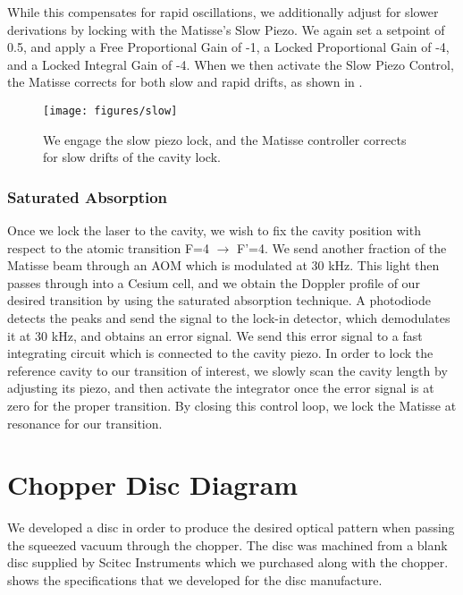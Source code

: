 While this compensates for rapid oscillations, we additionally adjust for slower derivations by locking with the Matisse's Slow Piezo.  We again set a setpoint of 0.5, and apply a Free Proportional Gain of -1, a Locked Proportional Gain of -4, and a Locked Integral Gain of -4.  When we then activate the Slow Piezo Control, the Matisse corrects for both slow and rapid drifts, as shown in .

\begin{figure}[!ht] 
 \centering 
 \texttt{[image: figures/slow]} 
 \caption[Matisse slow piezo lock]{We engage the slow piezo lock, and the Matisse controller corrects for slow drifts of the cavity lock.} 
 \label{fig:slow} 
\end{figure}

\subsubsection{Saturated Absorption}

Once we lock the laser to the cavity, we wish to fix the cavity position with respect to the atomic transition F=4 $\to$ F'=4.  We send another fraction of the Matisse beam through an AOM which is modulated at 30 kHz.  This light then passes through into a Cesium cell, and we obtain the Doppler profile of our desired transition by using the saturated absorption technique.  A photodiode detects the peaks and send the signal to the lock-in detector, which demodulates it at 30 kHz, and obtains an error signal.  We send this error signal to a fast integrating circuit which is connected to the cavity piezo.  In order to lock the reference cavity to our transition of interest, we slowly scan the cavity length by adjusting its piezo, and then activate the integrator once the error signal is at zero for the proper transition.  By closing this control loop, we lock the Matisse at resonance for our transition.


\clearpage
\section{Chopper Disc Diagram}
\label{appendix:chopper_disc_diagram} 

 We developed a disc in order to produce the desired optical pattern when passing the squeezed vacuum through the chopper.  The disc was machined from a blank disc supplied by Scitec Instruments which we purchased along with the chopper.   shows the specifications that we developed for the disc manufacture.

